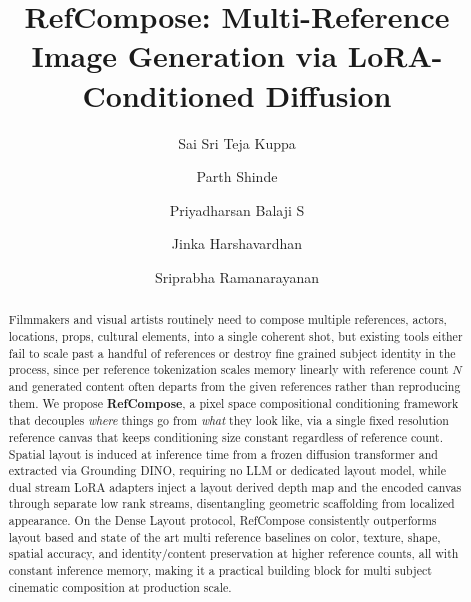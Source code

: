 \title{RefCompose: Multi-Reference Image Generation via LoRA-Conditioned Diffusion} 


\author{Sai Sri Teja Kuppa \and
Parth Shinde \and
Priyadharsan Balaji S \and
Jinka Harshavardhan \and
Sriprabha Ramanarayanan}



\maketitle

\begin{abstract}
  Filmmakers and visual artists routinely need to compose multiple references, actors, locations, props, cultural elements, into a single coherent shot, but existing tools either fail to scale past a handful of references or destroy fine grained subject identity in the process, since per reference tokenization scales memory linearly with reference count $N$ and generated content often departs from the given references rather than reproducing them. We propose \textbf{RefCompose}, a pixel space compositional conditioning framework that decouples \emph{where} things go from \emph{what} they look like, via a single fixed resolution reference canvas that keeps conditioning size constant regardless of reference count. Spatial layout is induced at inference time from a frozen diffusion transformer and extracted via Grounding DINO, requiring no LLM or dedicated layout model, while dual stream LoRA adapters inject a layout derived depth map and the encoded canvas through separate low rank streams, disentangling geometric scaffolding from localized appearance. On the Dense Layout protocol, RefCompose consistently outperforms layout based and state of the art multi reference baselines on color, texture, shape, spatial accuracy, and identity/content preservation at higher reference counts, all with constant inference memory, making it a practical building block for multi subject cinematic composition at production scale.
  \end{abstract}

